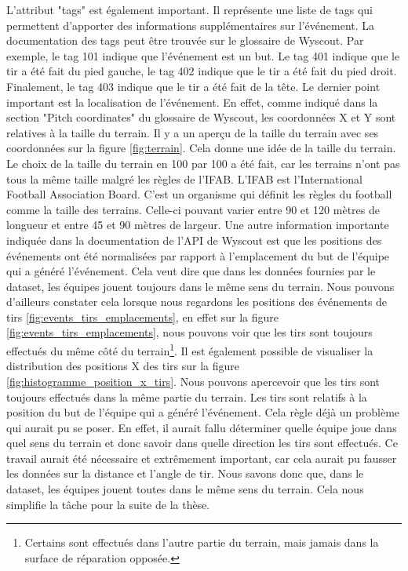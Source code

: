 \documentclass[12pt]{article}
\begin{document}
L'attribut "tags" est également important.
Il représente une liste de tags qui permettent d'apporter des informations supplémentaires sur l'événement.
La documentation des tags peut être trouvée sur le glossaire de Wyscout. \cite{WyscoutGlossary}
Par exemple, le tag 101 indique que l'événement est un but. 
Le tag 401 indique que le tir a été fait du pied gauche, le tag 402 indique que le tir a été fait du pied droit.
Finalement, le tag 403 indique que le tir a été fait de la tête.
\newline\newline
Le dernier point important est la localisation de l'événement.
En effet, comme indiqué dans la section "Pitch coordinates" du glossaire de Wyscout, \cite{WyscoutGlossary} les coordonnées X et Y sont relatives à la taille du terrain.
Il y a un aperçu de la taille du terrain avec ses coordonnées sur la figure \ref{fig:terrain}.
Cela donne une idée de la taille du terrain.
Le choix de la taille du terrain en 100 par 100 a été fait, car les terrains n'ont pas tous la même taille malgré les règles de l'IFAB.
\newline\newline
L'IFAB est l'International Football Association Board.
C'est un organisme qui définit les règles du football comme la taille des terrains.
Celle-ci pouvant varier entre 90 et 120 mètres de longueur et entre 45 et 90 mètres de largeur. \cite{TerrainIFAB}
\newline\newline 
Une autre information importante indiquée dans la documentation de l'API de Wyscout \cite{WyscoutAPI} est que les positions des événements ont été normalisées par rapport à l'emplacement du but de l'équipe qui a généré l'événement.
Cela veut dire que dans les données fournies par le dataset, les équipes jouent toujours dans le même sens du terrain.
Nous pouvons d'ailleurs constater cela lorsque nous regardons les positions des événements de tirs \ref{fig:events_tirs_emplacements}, en effet sur la figure \ref{fig:events_tirs_emplacements}, nous pouvons voir que les tirs sont toujours effectués du même côté du terrain\footnote{Certains sont effectués dans l'autre partie du terrain, mais jamais dans la surface de réparation opposée.}.
Il est également possible de visualiser la distribution des positions X des tirs sur la figure \ref{fig:histogramme_position_x_tirs}.
Nous pouvons apercevoir que les tirs sont toujours effectués dans la même partie du terrain.
Les tirs sont relatifs à la position du but de l'équipe qui a généré l'événement.
Cela règle déjà un problème qui aurait pu se poser.
En effet, il aurait fallu déterminer quelle équipe joue dans quel sens du terrain et donc savoir dans quelle direction les tirs sont effectués.
Ce travail aurait été nécessaire et extrêmement important, car cela aurait pu fausser les données sur la distance et l'angle de tir.
\newline\newline
Nous savons donc que, dans le dataset, les équipes jouent toutes dans le même sens du terrain. Cela nous simplifie la tâche pour la suite de la thèse.
\end{document}
